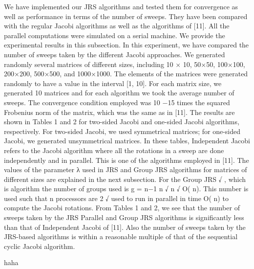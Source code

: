 \documentclass[10pt, conference, compsocconf]{IEEEtran}
\begin{document}
We have implemented our JRS algorithms and tested them
for convergence as well as performance in terms of the number
of sweeps. They have been compared with the regular Jacobi
algorithms as well as the algorithms of [11]. All the parallel
computations were simulated on a serial machine. We provide
the experimental results in this subsection.
In this experiment, we have compared the number of
sweeps taken by the different Jacobi approaches. We generated
randomly several matrices of different sizes, including 10 ×
10, 50×50, 100×100, 200×200, 500×500, and 1000×1000.
The elements of the matrices were generated randomly to have a
value in the interval [1, 10]. For each matrix size, we generated
10 matrices and for each algorithm we took the average number
of sweeps. The convergence condition employed was 10 −15
times the squared Frobenius norm of the matrix, which was the
same as in [11].
The results are shown in Tables 1 and 2 for two-sided Jacobi
and one-sided Jacobi algorithms, respectively. For two-sided
Jacobi, we used symmetrical matrices; for one-sided Jacobi, we
generated unsymmetrical matrices. In these tables, Independent
Jacobi refers to the Jacobi algorithm where all the rotations in
a sweep are done independently and in parallel. This is one of
the algorithms employed in [11]. The values of the parameter λ
used in JRS and Group JRS algorithms for matrices of different
sizes are explained in the next subsection. For the Group JRS
√ , which is
algorithm the number of groups used is g = n−1
n
√
n √
O( n). This number is used such
that
n
processors
are
2
√
used to run in parallel in time O( n) to compute the Jacobi
rotations.
From Tables 1 and 2, we see that the number of sweeps taken
by the JRS Parallel and Group JRS algorithms is significantly
less than that of Independent Jacobi of [11]. Also the number
of sweeps taken by the JRS-based algorithms is within a
reasonable multiple of that of the sequential cyclic Jacobi
algorithm.

haha
\end{document}
